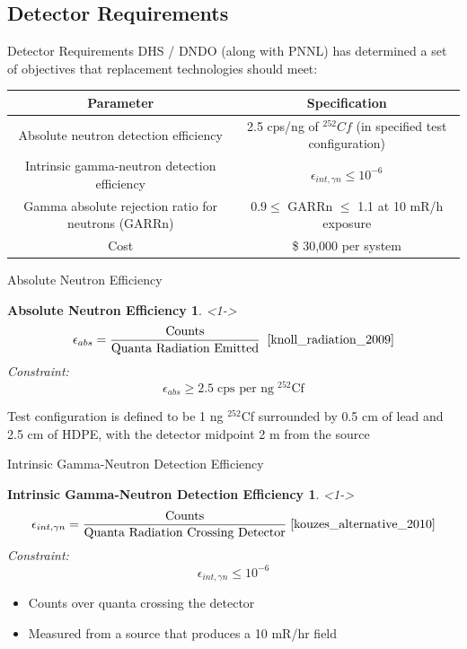 \subsection{Detector Requirements}
\begin{frame}{Detector Requirements}
DHS / DNDO (along with PNNL) has determined a set of objectives that replacement technologies should meet:
\begin{table}
	\tiny
	\begin{tabular}{c c }
	Parameter & Specification \\
	\hline
	\hline
	Absolute neutron detection efficiency & 2.5 cps/ng of ${}^{252}Cf$ (in specified test configuration) \\
	Intrinsic gamma-neutron detection efficiency & $ \epsilon_{int,\gamma n}\leq 10^{-6}$ \\
	Gamma absolute rejection ratio for neutrons (GARRn) & $ 0.9 \leq \text{ GARRn }\leq$ 1.1 at 10 mR/h exposure \\
	Cost &  \$ 30,000 per system \\
	\hline
	\end{tabular}
\end{table}
\end{frame}

\begin{frame}{Absolute Neutron Efficiency}
\newtheorem{thm1}{Absolute Neutron Efficiency}
\begin{thm1}<1->
$$\epsilon_{abs} = \frac{\text{Counts}}{\text{Quanta Radiation Emitted}}\; \; \protect \cite{knoll_radiation_2009} $$
Constraint:
$$\epsilon_{abs} \geq 2.5\; \text{cps per ng}\; {}^{252}\text{Cf}$$
\end{thm1}
Test configuration is defined to be 1 ng ${}^{252}$Cf surrounded by 0.5 cm of lead and 2.5 cm of HDPE, with the detector midpoint 2 m from the source \cite{kouzes_alternative_2010}
\end{frame}


\begin{frame}{Intrinsic Gamma-Neutron Detection Efficiency}
\newtheorem{thm2}{Intrinsic Gamma-Neutron Detection Efficiency}
\begin{thm2}<1->
$$\epsilon_{int,\gamma n} = \frac{\text{Counts}}{\text{Quanta Radiation Crossing Detector}} \; \protect \cite{kouzes_alternative_2010} $$
Constraint:
$$ \epsilon_{int,\gamma n} \leq 10^{-6} $$
\end{thm2}
\begin{itemize}
	\item Counts over quanta crossing the detector
	\item Measured from a source that produces a 10 mR/hr field
\end{itemize}
\end{frame}


